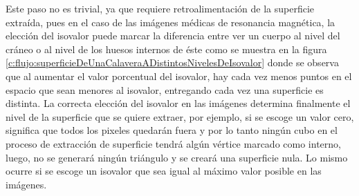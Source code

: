 Este paso no es trivial, ya que requiere retroalimentación de la superficie extraída, pues en el caso de las imágenes médicas de resonancia magnética, la elección del isovalor puede marcar la diferencia entre ver un cuerpo al nivel del cráneo o al nivel de los huesos internos de éste como se muestra en la figura \ref{c:flujo:superficieDeUnaCalaveraADistintosNivelesDeIsovalor} donde se observa que al aumentar el valor porcentual del isovalor, hay cada vez menos puntos en el espacio que sean menores al isovalor, entregando cada vez una superficie es distinta. La correcta elección del isovalor en las imágenes determina finalmente el nivel de la superficie que se quiere extraer, por ejemplo, si se escoge un valor cero, significa que todos los pixeles quedarán fuera y por lo tanto ningún cubo en el proceso de extracción de superficie tendrá algún vértice marcado como interno, luego, no se generará ningún triángulo y se creará una superficie nula.
Lo mismo ocurre si se escoge un isovalor que sea igual al máximo valor posible en las imágenes.


